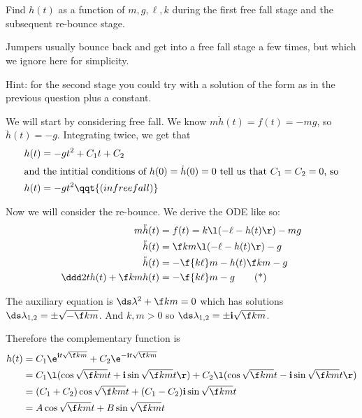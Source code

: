 \documentclass[a4paper]{article}
\begin{document}
\subsection{~} %

\begin{questionbody}
Find $h(t)$ as a function of $m, g, \ell, k$ during the first free fall stage and the subsequent re-bounce stage.

Jumpers usually bounce back and get into a free fall stage a few times, but which we ignore here for simplicity.

Hint: for the second stage you could try with a solution of the form as in the previous question plus a constant.
\end{questionbody}

We will start by considering free fall. We know $m \ddot h(t) = f(t) = -mg$, so $\ddot h(t) = -g$. Integrating twice, we get that \begin{align*}
h(t) &= -g t^2 + C_1 t + C_2 \\
\intertext{and the intitial conditions of $h(0) = \dot h(0) = 0$ tell us that $C_1 = C_2 = 0$, so}
h(t) &= -g t^2 \qqt{(in free fall)}
\end{align*}

Now we will consider the re-bounce. We derive the ODE like so: \begin{align*}
m \ddot h(t) &= f(t) = k \l( -\ell - h(t) \r) - mg \\
\ddot h(t) &= \f km \l( -\ell - h(t) \r) - g \\
\ddot h(t) &= -\f{k\ell}m - h(t) \f km - g \\
\ddd 2{}t h(t) + \f km h(t) &= -\f{k\ell}m - g \tag{*}\label{eqn:Q3a-second-order-ODE}
\end{align*}

The auxiliary equation is $\ds \lambda^2 + \f km = 0$ which has solutions $\ds \lambda_{1,2} = \pm \sqrt{-\f km}$. And $k, m > 0$ so $\ds \lambda_{1,2} = \pm \mathbf{i} \sqrt{\f km}$.

Therefore the complementary function is \begin{align*}
h(t) &= C_1 \e^{\mathbf i t \sqrt{\f km}} + C_2 \e^{-\mathbf i t \sqrt{\f km}} \\
&= C_1 \l( \cos \sqrt{\f km} t + \mathbf i \sin \sqrt{\f km} t \r) + C_2 \l( \cos \sqrt{\f km} t - \mathbf i \sin \sqrt{\f km} t \r) \\
&= (C_1 + C_2) \cos \sqrt{\f km} t + (C_1 - C_2) \mathbf i \sin \sqrt{\f km} t \\
&= A \cos \sqrt{\f km} t + B \sin \sqrt{\f km} t
\end{align*}
\end{document}
